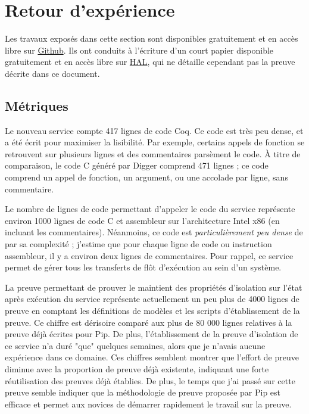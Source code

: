 			\newpage

	\section{Retour d'expérience}
	Les travaux exposés dans cette section sont disponibles gratuitement et en accès libre sur \href{https://github.com/2xs/pipcore}{Github}. Ils ont conduits à l'écriture d'un court papier disponible gratuitement et en accès libre sur \href{https://hal.archives-ouvertes.fr/hal-02347481}{HAL}, qui ne détaille cependant pas la preuve décrite dans ce document.

		\subsection{Métriques}

		Le nouveau service compte 417 lignes de code Coq. Ce code est très peu dense, et a été écrit pour maximiser la lisibilité. Par exemple, certains appels de fonction se retrouvent sur plusieurs lignes et des commentaires parsèment le code. À titre de comparaison, le code C généré par Digger comprend 471 lignes ; ce code comprend un appel de fonction, un argument, ou une accolade par ligne, sans commentaire.

		Le nombre de lignes de code permettant d'appeler le code du service représente environ 1000 lignes de code C et assembleur sur l'architecture Intel x86 (en incluant les commentaires). Néanmoins, ce code est \emph{particulièrement peu dense} de par sa complexité ; j'estime que pour chaque ligne de code ou instruction assembleur, il y a environ deux lignes de commentaires. 
		Pour rappel, ce service permet de gérer tous les transferts de flôt d'exécution au sein d'un système. 

		La preuve permettant de prouver le maintient des propriétés d'isolation sur l'état après exécution du service représente actuellement un peu plus de 4000 lignes de preuve en comptant les définitions de modèles et les scripts d'établissement de la preuve. Ce chiffre est dérisoire comparé aux plus de 80 000 lignes relatives à la preuve déjà écrites pour Pip. De plus, l'établissement de la preuve d'isolation de ce service n'a duré "que" quelques semaines, alors que je n'avais aucune expérience dans ce domaine. Ces chiffres semblent montrer que l'effort de preuve diminue avec la proportion de preuve déjà existente, indiquant une forte réutilisation des preuves déjà établies. De plus, le temps que j'ai passé sur cette preuve semble indiquer que la méthodologie de preuve proposée par Pip est efficace et permet aux novices de démarrer rapidement le travail sur la preuve.

